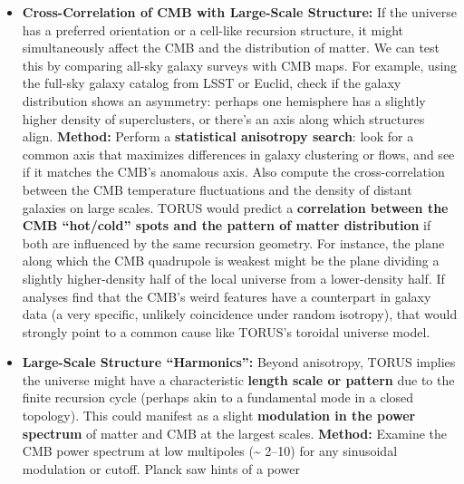 \documentclass[]{article}
\begin{document}
{\begin{itemize}
\begin{itemize}
    data quirk​. TORUS predicts that these large-scale anisotropies will
    \emph{persist} and even sharpen with better data​. On the other
    hand, if polarization maps come out perfectly isotropic (no odd
    alignments), it would indicate the temperature anomalies were likely
    just flukes or systematics, undermining TORUS's prediction here​.
>>>>>>> 5d40795 (Fix: robust Unicode/maths in LaTeX and explicit push to main in workflow)
  \item
    \textbf{Cross-Correlation of CMB with Large-Scale Structure:} If the
    universe has a preferred orientation or a cell-like recursion
    structure, it might simultaneously affect the CMB and the
    distribution of matter. We can test this by comparing all-sky galaxy
    surveys with CMB maps​. For example, using the full-sky galaxy
    catalog from LSST or Euclid, check if the galaxy distribution shows
    an asymmetry: perhaps one hemisphere has a slightly higher density
    of superclusters, or there's an axis along which structures align.
    \textbf{Method:} Perform a \textbf{statistical anisotropy search}:
    look for a common axis that maximizes differences in galaxy
    clustering or flows, and see if it matches the CMB's anomalous axis.
    Also compute the cross-correlation between the CMB temperature
    fluctuations and the density of distant galaxies on large scales.
    TORUS would predict a \textbf{correlation between the CMB
    ``hot/cold'' spots and the pattern of matter distribution} if both
    are influenced by the same recursion geometry​. For instance, the
    plane along which the CMB quadrupole is weakest might be the plane
    dividing a slightly higher-density half of the local universe from a
    lower-density half​. If analyses find that the CMB's weird features
    have a counterpart in galaxy data (a very specific, unlikely
    coincidence under random isotropy), that would strongly point to a
    common cause like TORUS's toroidal universe model​.
  \item
    \textbf{Large-Scale Structure ``Harmonics'':} Beyond anisotropy,
    TORUS implies the universe might have a characteristic
    \textbf{length scale or pattern} due to the finite recursion cycle
    (perhaps akin to a fundamental mode in a closed topology). This
    could manifest as a slight \textbf{modulation in the power spectrum}
    of matter and CMB at the largest scales. \textbf{Method:} Examine
    the CMB power spectrum at low multipoles (\ell \textasciitilde{} 2--10)
    for any sinusoidal modulation or cutoff. Planck saw hints of a power

\end{itemize}
\end{itemize}}
\end{document}
